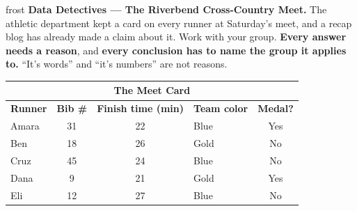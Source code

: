 \documentclass[10pt]{article}
\begin{document}

\vspace{0.15in}

\begin{headlinebox}{frost}
\small
\textbf{Data Detectives --- The Riverbend Cross-Country Meet.} The athletic department kept a
card on every runner at Saturday's meet, and a recap blog has already made a claim about it.
Work with your group. \textbf{Every answer needs a reason}, and \textbf{every conclusion has to
name the group it applies to.} ``It's words'' and ``it's numbers'' are not reasons.
\end{headlinebox}

\vspace{0.06in}

\begin{center}
\small
\renewcommand{\arraystretch}{1.15}
\begin{tabular}{@{} l c c l c @{}}
\multicolumn{5}{c}{\textbf{The Meet Card}} \\
\toprule
\textbf{Runner} & \textbf{Bib \#} & \textbf{Finish time (min)} &
\textbf{Team color} & \textbf{Medal?} \\
\midrule
Amara & 31 & 22 & Blue & Yes \\
Ben   & 18 & 26 & Gold & No  \\
Cruz  & 45 & 24 & Blue & No  \\
Dana  &  9 & 21 & Gold & Yes \\
Eli   & 12 & 27 & Blue & No  \\
\bottomrule
\end{tabular}
\end{center}

\vspace{0.06in}
\end{document}
